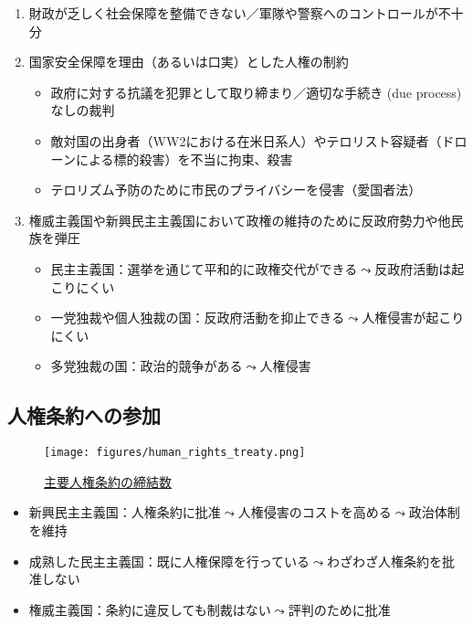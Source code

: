 \documentclass[
  xelatex,
  ja=standard]{bxjsarticle}
\providecommand{\tightlist}{%
  \setlength{\itemsep}{0pt}\setlength{\parskip}{0pt}}\usepackage{longtable,booktabs,array}
\begin{document}
\begin{enumerate}
\def\labelenumi{\arabic{enumi}.}
\tightlist
\item
  財政が乏しく社会保障を整備できない／軍隊や警察へのコントロールが不十分\citep{cole2015}
\item
  国家安全保障を理由（あるいは口実）とした人権の制約\citep{poe1994, krain1997}

  \begin{itemize}
  \tightlist
  \item
    政府に対する抗議を犯罪として取り締まり／適切な手続き (due process)
    なしの裁判
  \item
    敵対国の出身者（WW2における在米日系人）やテロリスト容疑者（ドローンによる標的殺害）を不当に拘束、殺害
  \item
    テロリズム予防のために市民のプライバシーを侵害（愛国者法）
  \end{itemize}
\item
  権威主義国や新興民主主義国\citep{davenport1995}において政権の維持のために反政府勢力や他民族を弾圧

  \begin{itemize}
  \tightlist
  \item
    民主主義国：選挙を通じて平和的に政権交代ができる\(\leadsto\)反政府活動は起こりにくい
  \item
    一党独裁や個人独裁の国：反政府活動を抑止できる\(\leadsto\)人権侵害が起こりにくい
  \item
    多党独裁の国：政治的競争がある\(\leadsto\)人権侵害\citep{vreeland2008}
  \end{itemize}
\end{enumerate}

\hypertarget{ux4ebaux6a29ux6761ux7d04ux3078ux306eux53c2ux52a0}{%
\subsection{人権条約への参加}\label{ux4ebaux6a29ux6761ux7d04ux3078ux306eux53c2ux52a0}}

\begin{figure}[htpb]

{\centering \texttt{[image: figures/human\_rights\_treaty.png]}

}

\caption{\href{https://indicators.ohchr.org}{主要人権条約の締結数}}

\end{figure}

\begin{itemize}
\tightlist
\item
  新興民主主義国：人権条約に批准\(\leadsto\)人権侵害のコストを高める\(\leadsto\)政治体制を維持\citep{moravcsik2000}
\item
  成熟した民主主義国：既に人権保障を行っている\(\leadsto\)わざわざ人権条約を批准しない
\item
  権威主義国：条約に違反しても制裁はない\(\leadsto\)評判のために批准
\end{itemize}
\end{document}
